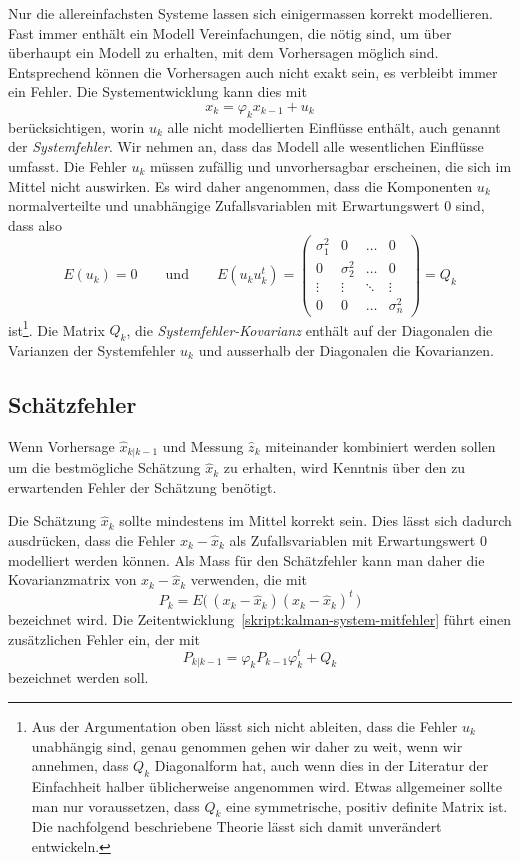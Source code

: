 Nur die allereinfachsten Systeme lassen sich einigermassen korrekt modellieren.
Fast immer enthält ein Modell Vereinfachungen, die nötig sind, um über
überhaupt ein Modell zu erhalten, mit dem Vorhersagen möglich sind.
Entsprechend können die Vorhersagen auch nicht exakt sein, es verbleibt
immer ein Fehler.
Die Systementwicklung kann dies mit
\begin{equation}
x_k = \varphi_k x_{k-1} + u_k
\label{skript:kalman-system-mitfehler}
\end{equation}
berücksichtigen, worin $u_k$ alle nicht modellierten Einflüsse
enthält, auch genannt der {\em Systemfehler}. 
Wir nehmen an, dass das Modell alle wesentlichen Einflüsse umfasst.
Die Fehler $u_k$ müssen zufällig und unvorhersagbar erscheinen,
die sich im Mittel nicht auswirken.
Es wird daher angenommen, dass die Komponenten $u_k$ normalverteilte
und unabhängige Zufallsvariablen mit Erwartungswert $0$ sind, dass also
\[
E(u_k)=0
\qquad\text{und}\qquad
E(u_ku_k^t)
=
\begin{pmatrix}
\sigma_1^2&0         &\dots &0\\
0         &\sigma_2^2&\dots &0\\
\vdots    &\vdots    &\ddots&\vdots\\
0         &0         &\dots &\sigma_n^2
\end{pmatrix}
=
Q_k
\]
ist\footnote{%
Aus der Argumentation oben lässt sich nicht ableiten, dass
die Fehler $u_k$ unabhängig sind, genau genommen gehen wir daher zu
weit, wenn wir annehmen, dass $Q_k$ Diagonalform hat, auch wenn dies
in der Literatur der Einfachheit halber üblicherweise angenommen wird.
Etwas allgemeiner sollte man nur voraussetzen, dass $Q_k$ eine symmetrische,
positiv definite Matrix ist.
Die nachfolgend beschriebene Theorie lässt sich damit unverändert
entwickeln.
}.
Die Matrix $Q_k$, die {\em Systemfehler-Kovarianz}
enthält auf der Diagonalen die Varianzen der Systemfehler $u_k$ 
und ausserhalb der Diagonalen die Kovarianzen.

\subsection{Schätzfehler\label{subsection:schaetzfehler}}
Wenn Vorhersage $\hat{x}_{k|k-1}$ und Messung $\hat{z}_k$ 
miteinander kombiniert werden sollen um die bestmögliche Schätzung
$\hat{x}_k$ zu erhalten, wird Kenntnis über den zu erwartenden
Fehler der Schätzung benötigt.

Die Schätzung $\hat{x}_k$ sollte mindestens im Mittel korrekt sein.
Dies lässt sich dadurch ausdrücken, dass die Fehler $x_k - \hat{x}_k$
als Zufallsvariablen mit Erwartungswert $0$ modelliert werden können.
Als Mass für den Schätzfehler kann man daher die Kovarianzmatrix von
%
$x_k-\hat{x}_k$ verwenden, die mit
\[
P_k =  E\bigl(\, (x_k-\hat{x}_k) (x_k-\hat{x}_k)^t\,\bigr)
\]
bezeichnet wird.
Die Zeitentwicklung~\eqref{skript:kalman-system-mitfehler} führt einen
zusätzlichen Fehler ein, der mit
\begin{equation}
P_{k|k-1} = \varphi_k P_{k-1} \varphi_k^t + Q_k
\label{skript:kalman:fehlerentwicklung}
\end{equation}
bezeichnet werden soll.

